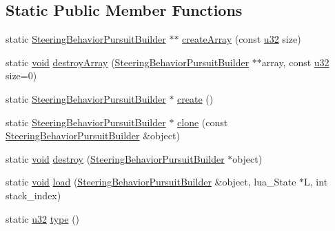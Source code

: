 \subsection*{Static Public Member Functions}
\begin{DoxyCompactItemize}
\item 
static \mbox{\hyperlink{classnjli_1_1_steering_behavior_pursuit_builder}{Steering\+Behavior\+Pursuit\+Builder}} $\ast$$\ast$ \mbox{\hyperlink{classnjli_1_1_steering_behavior_pursuit_builder_ad8703df1b50866be041606e627ed9d84}{create\+Array}} (const \mbox{\hyperlink{_util_8h_a10e94b422ef0c20dcdec20d31a1f5049}{u32}} size)
\item 
static \mbox{\hyperlink{_thread_8h_af1e856da2e658414cb2456cb6f7ebc66}{void}} \mbox{\hyperlink{classnjli_1_1_steering_behavior_pursuit_builder_afb5b797e2ee050335cbfe421e4211669}{destroy\+Array}} (\mbox{\hyperlink{classnjli_1_1_steering_behavior_pursuit_builder}{Steering\+Behavior\+Pursuit\+Builder}} $\ast$$\ast$array, const \mbox{\hyperlink{_util_8h_a10e94b422ef0c20dcdec20d31a1f5049}{u32}} size=0)
\item 
static \mbox{\hyperlink{classnjli_1_1_steering_behavior_pursuit_builder}{Steering\+Behavior\+Pursuit\+Builder}} $\ast$ \mbox{\hyperlink{classnjli_1_1_steering_behavior_pursuit_builder_a1205f423c04365cb699013f9aad38e13}{create}} ()
\item 
static \mbox{\hyperlink{classnjli_1_1_steering_behavior_pursuit_builder}{Steering\+Behavior\+Pursuit\+Builder}} $\ast$ \mbox{\hyperlink{classnjli_1_1_steering_behavior_pursuit_builder_ad502722e4a43b00f7272aa6f162c7628}{clone}} (const \mbox{\hyperlink{classnjli_1_1_steering_behavior_pursuit_builder}{Steering\+Behavior\+Pursuit\+Builder}} \&object)
\item 
static \mbox{\hyperlink{_thread_8h_af1e856da2e658414cb2456cb6f7ebc66}{void}} \mbox{\hyperlink{classnjli_1_1_steering_behavior_pursuit_builder_a6ae203825f37b0dc68bd04a5356ae9cd}{destroy}} (\mbox{\hyperlink{classnjli_1_1_steering_behavior_pursuit_builder}{Steering\+Behavior\+Pursuit\+Builder}} $\ast$object)
\item 
static \mbox{\hyperlink{_thread_8h_af1e856da2e658414cb2456cb6f7ebc66}{void}} \mbox{\hyperlink{classnjli_1_1_steering_behavior_pursuit_builder_a75adf4a9ed10d8bc8ee9ad39c2336c8c}{load}} (\mbox{\hyperlink{classnjli_1_1_steering_behavior_pursuit_builder}{Steering\+Behavior\+Pursuit\+Builder}} \&object, lua\+\_\+\+State $\ast$L, int stack\+\_\+index)
\item 
static \mbox{\hyperlink{_util_8h_a10e94b422ef0c20dcdec20d31a1f5049}{u32}} \mbox{\hyperlink{classnjli_1_1_steering_behavior_pursuit_builder_aea1c43fc5260530b4ec5fe127450112d}{type}} ()
\end{DoxyCompactItemize}
